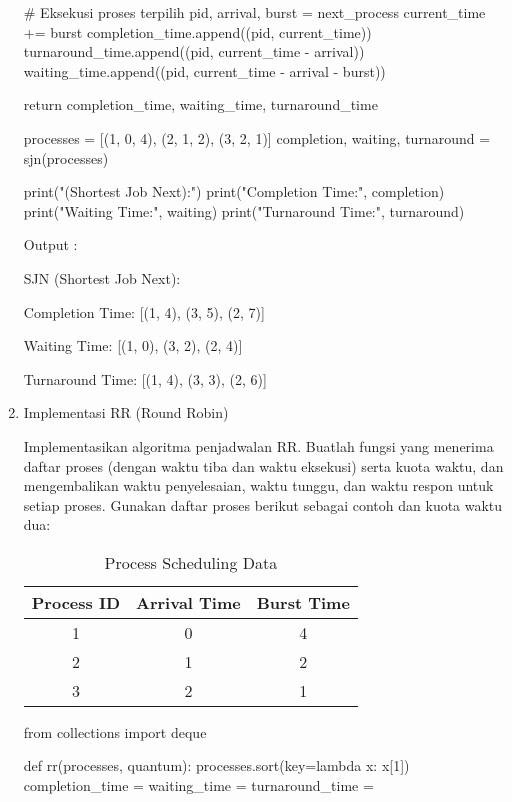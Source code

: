 \documentclass[12pt]{article}
\begin{document}
\begin{enumerate}
\begin{python}
        # Eksekusi proses terpilih
        pid, arrival, burst = next_process
        current_time += burst
        completion_time.append((pid, current_time))
        turnaround_time.append((pid, current_time - arrival))
        waiting_time.append((pid, current_time - arrival - burst))

    return completion_time, waiting_time, turnaround_time

processes = [(1, 0, 4), (2, 1, 2), (3, 2, 1)]
completion, waiting, turnaround = sjn(processes)

print("\nSJN (Shortest Job Next):")
print("Completion Time:", completion)
print("Waiting Time:", waiting)
print("Turnaround Time:", turnaround)
\end{python}
        Output : 
        \par SJN (Shortest Job Next):
        \par Completion Time: [(1, 4), (3, 5), (2, 7)]
        \par Waiting Time: [(1, 0), (3, 2), (2, 4)]
        \par Turnaround Time: [(1, 4), (3, 3), (2, 6)]
        
    \item Implementasi RR (Round Robin)
        \par  Implementasikan algoritma penjadwalan RR. Buatlah fungsi yang menerima daftar proses (dengan waktu tiba dan waktu eksekusi) serta kuota waktu, dan mengembalikan waktu penyelesaian, waktu tunggu, dan waktu respon untuk setiap proses. Gunakan daftar proses berikut sebagai contoh dan kuota waktu dua:
        \begin{table}[h!]
        \centering
        \begin{tabular}{|c|c|c|}
        \hline
        \textbf{Process ID} & \textbf{Arrival Time} & \textbf{Burst Time} \\ \hline
        1 & 0 & 4 \\ \hline
        2 & 1 & 2 \\ \hline
        3 & 2 & 1 \\ \hline
        \end{tabular}
        \caption{Process Scheduling Data}
        \end{table}
        
\begin{python}
from collections import deque

def rr(processes, quantum):
    processes.sort(key=lambda x: x[1]) 
    completion_time = {}
    waiting_time = {}
    turnaround_time = {}
    

\end{python}
\end{enumerate}
\end{document}
